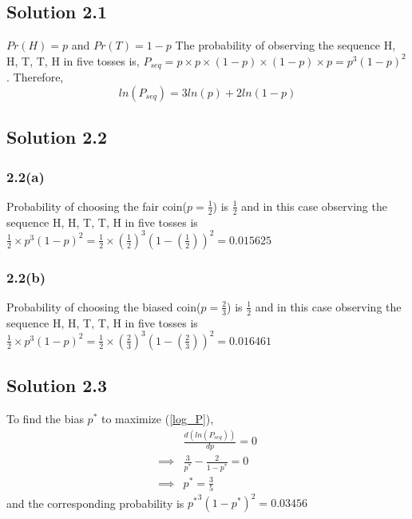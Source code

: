 \subsection*{Solution 2.1}
$Pr(H) = p$ and $Pr(T) = 1-p$
\newline
The probability of observing the sequence H, H, T, T, H in five tosses is, $P_{seq} = p\times p \times (1-p) \times (1-p) \times p = p^3(1-p)^2$.
Therefore,
\begin{equation}
\label{log_P}
	ln(P_{seq}) = 3ln(p) + 2ln(1-p)
\end{equation}

\subsection*{Solution 2.2}
\subsubsection*{2.2(a)}
Probability of choosing the fair coin($p=\frac{1}{2}$) is $\frac{1}{2}$ and in this case observing the sequence H, H, T, T, H in five tosses is $\frac{1}{2} \times p^3(1-p)^2 = \frac{1}{2} \times (\frac{1}{2})^3(1-(\frac{1}{2}))^2 = 0.015625$ 
\subsubsection*{2.2(b)}
Probability of choosing the biased coin($p=\frac{2}{3}$) is $\frac{1}{2}$ and in this case observing the sequence H, H, T, T, H in five tosses is $\frac{1}{2} \times p^3(1-p)^2 = \frac{1}{2} \times (\frac{2}{3})^3(1-(\frac{2}{3}))^2 = 0.016461$ 
\subsection*{Solution 2.3}
To find the bias $p^*$ to maximize (\ref{log_P}),
\begin{equation}
	\begin{split}
					& \frac{d(ln(P_{seq}))}{dp} = 0\\
		\implies	& \frac{3}{p^*} - \frac{2}{1-p^*} = 0\\
		\implies	& p^* = \frac{3}{5}
	\end{split}
\end{equation}
and the corresponding probability is ${p^*}^3(1-p^*)^2 = 0.03456$